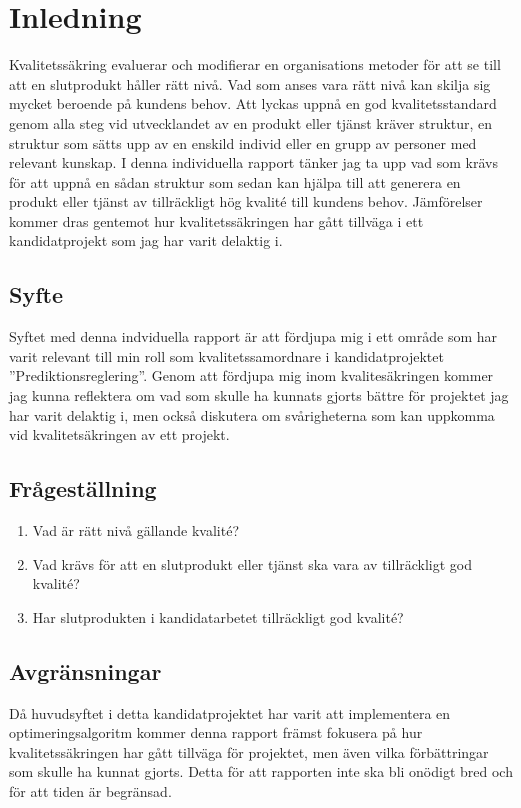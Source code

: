 \section{Inledning}
Kvalitetssäkring evaluerar och modifierar en organisations metoder för att se till att en slutprodukt håller rätt nivå. Vad som anses vara rätt nivå  kan skilja sig mycket beroende på kundens behov. 
\newline
\newline
Att lyckas uppnå en god kvalitetsstandard genom alla steg vid utvecklandet av en produkt eller tjänst kräver struktur, en struktur som sätts upp av en enskild individ eller en grupp av personer med relevant kunskap. I denna individuella rapport tänker jag ta upp vad som krävs för att uppnå en sådan struktur som sedan kan hjälpa till att generera en produkt eller tjänst av tillräckligt hög kvalité till kundens behov. Jämförelser kommer dras gentemot hur kvalitetssäkringen har gått tillväga i ett kandidatprojekt som jag har varit delaktig i.

\subsection{Syfte}
Syftet med denna indviduella rapport är att fördjupa mig i ett område som har varit relevant till min roll som kvalitetssamordnare i kandidatprojektet ''Prediktionsreglering''. 
\newline
\newline
Genom att fördjupa mig inom kvalitesäkringen kommer jag kunna reflektera om vad som skulle ha kunnats gjorts bättre för projektet jag har varit delaktig i, men också diskutera om svårigheterna som kan uppkomma vid kvalitetsäkringen av ett projekt.

\subsection{Frågeställning}

\begin{enumerate}
  \item Vad är rätt nivå gällande kvalité?
  \item Vad krävs för att en slutprodukt eller tjänst ska vara av tillräckligt god kvalité?
  \item Har slutprodukten i kandidatarbetet tillräckligt god kvalité?
\end{enumerate}

\subsection{Avgränsningar}

Då huvudsyftet i detta kandidatprojektet har varit att implementera en optimeringsalgoritm kommer denna rapport främst fokusera på hur kvalitetssäkringen har gått tillväga för projektet, men även vilka förbättringar som skulle ha kunnat gjorts. Detta för att rapporten inte ska bli onödigt bred och för att tiden är begränsad.


